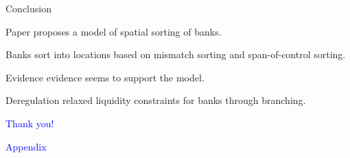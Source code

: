 \documentclass[notes,10pt, aspectratio=169]{beamer}
\newenvironment{wideitemize}{\itemize\addtolength{\itemsep}{10pt}}{\enditemize}
\begin{document}
\begin{frame}{Conclusion}
        \begin{wideitemize}

            \item Paper proposes a model of spatial sorting of banks.
    
            \item Banks sort into locations based on mismatch sorting and span-of-control sorting.
            \item Evidence evidence seems to support the model.
            \item Deregulation relaxed liquidity constraints for banks through branching.
        \end{wideitemize}
    \end{frame}
    

    \begin{frame}{}
        \centering
        \huge \textcolor{blue}{Thank you!}
    \end{frame}


    \appendix

    \begin{frame}[noframenumbering]
        \centering
        \huge \textcolor{blue}{Appendix}
    \end{frame}
\end{document}
